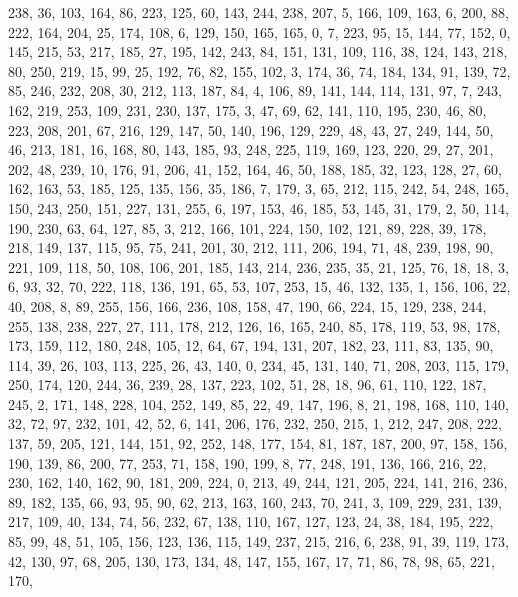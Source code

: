 \begin{DoxyCode}
       238, 36, 103, 164, 86, 223, 125, 60, 143, 244, 238, 207, 5, 166, 109, 163, 6, 200, 88, 222, 164, 204, 25, 174,
       108, 6, 129, 150, 165, 165, 0, 7, 223, 95, 15, 144, 77, 152, 0, 145, 215, 53, 217, 185, 27, 195, 142, 243,
       84, 151, 131, 109, 116, 38, 124, 143, 218, 80, 250, 219, 15, 99, 25, 192, 76, 82, 155, 102, 3, 174, 36, 74,
       184, 134, 91, 139, 72, 85, 246, 232, 208, 30, 212, 113, 187, 84, 4, 106, 89, 141, 144, 114, 131, 97, 7, 243,
       162, 219, 253, 109, 231, 230, 137, 175, 3, 47, 69, 62, 141, 110, 195, 230, 46, 80, 223, 208, 201, 67, 216,
       129, 147, 50, 140, 196, 129, 229, 48, 43, 27, 249, 144, 50, 46, 213, 181, 16, 168, 80, 143, 185, 93, 248,
       225, 119, 169, 123, 220, 29, 27, 201, 202, 48, 239, 10, 176, 91, 206, 41, 152, 164, 46, 50, 188, 185, 32, 123,
       128, 27, 60, 162, 163, 53, 185, 125, 135, 156, 35, 186, 7, 179, 3, 65, 212, 115, 242, 54, 248, 165, 150,
       243, 250, 151, 227, 131, 255, 6, 197, 153, 46, 185, 53, 145, 31, 179, 2, 50, 114, 190, 230, 63, 64, 127, 85,
       3, 212, 166, 101, 224, 150, 102, 121, 89, 228, 39, 178, 218, 149, 137, 115, 95, 75, 241, 201, 30, 212, 111,
       206, 194, 71, 48, 239, 198, 90, 221, 109, 118, 50, 108, 106, 201, 185, 143, 214, 236, 235, 35, 21, 125, 76,
       18, 18, 3, 6, 93, 32, 70, 222, 118, 136, 191, 65, 53, 107, 253, 15, 46, 132, 135, 1, 156, 106, 22, 40, 208,
       8, 89, 255, 156, 166, 236, 108, 158, 47, 190, 66, 224, 15, 129, 238, 244, 255, 138, 238, 227, 27, 111, 178,
       212, 126, 16, 165, 240, 85, 178, 119, 53, 98, 178, 173, 159, 112, 180, 248, 105, 12, 64, 67, 194, 131, 207,
       182, 23, 111, 83, 135, 90, 114, 39, 26, 103, 113, 225, 26, 43, 140, 0, 234, 45, 131, 140, 71, 208, 203, 115,
       179, 250, 174, 120, 244, 36, 239, 28, 137, 223, 102, 51, 28, 18, 96, 61, 110, 122, 187, 245, 2, 171, 148,
       228, 104, 252, 149, 85, 22, 49, 147, 196, 8, 21, 198, 168, 110, 140, 32, 72, 97, 232, 101, 42, 52, 6, 141,
       206, 176, 232, 250, 215, 1, 212, 247, 208, 222, 137, 59, 205, 121, 144, 151, 92, 252, 148, 177, 154, 81, 187,
       187, 200, 97, 158, 156, 190, 139, 86, 200, 77, 253, 71, 158, 190, 199, 8, 77, 248, 191, 136, 166, 216, 22,
       230, 162, 140, 162, 90, 181, 209, 224, 0, 213, 49, 244, 121, 205, 224, 141, 216, 236, 89, 182, 135, 66, 93,
       95, 90, 62, 213, 163, 160, 243, 70, 241, 3, 109, 229, 231, 139, 217, 109, 40, 134, 74, 56, 232, 67, 138, 110,
       167, 127, 123, 24, 38, 184, 195, 222, 85, 99, 48, 51, 105, 156, 123, 136, 115, 149, 237, 215, 216, 6, 238,
       91, 39, 119, 173, 42, 130, 97, 68, 205, 130, 173, 134, 48, 147, 155, 167, 17, 71, 86, 78, 98, 65, 221, 170,

\end{DoxyCode}
